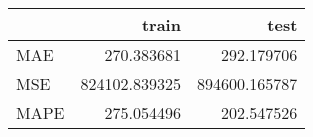 \begin{tabular}{lrr}
\toprule
{} &          train &           test \\
\midrule
MAE  &     270.383681 &     292.179706 \\
MSE  &  824102.839325 &  894600.165787 \\
MAPE &     275.054496 &     202.547526 \\
\bottomrule
\end{tabular}
